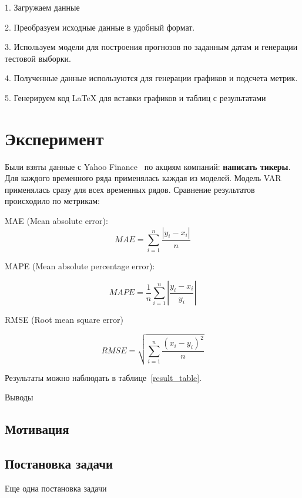 \documentclass[a4paper,article,14pt]{extarticle}
\begin{document}
1.
Загружаем данные

2.
Преобразуем исходные данные в удобный формат.

3.
Используем модели для построения прогнозов по заданным датам и генерации тестовой выборки.

4.
Полученные данные используются для генерации графиков и подсчета метрик.

5.
Генерируем код LaTeX для вставки графиков и таблиц с результатами

\section{Эксперимент}

Были взяты данные с Yahoo Finance~\cite{yahoo} по акциям компаний: \textbf{написать тикеры}.
Для каждого временного ряда применялась каждая из моделей.
Модель VAR применялась сразу для всех временных рядов.
Сравнение результатов происходило по метрикам:

MAE (Mean absolute error):
\begin{equation}
    MAE = \sum_{i=1}^{n} \frac{|y_i - x_i|}{n}\label{eq:mae}
\end{equation}

MAPE (Mean absolute percentage error):

\begin{equation}
    MAPE = \frac{1}{n} \sum_{i=1}^{n} \left| \frac{y_i - x_i}{y_i} \right|\label{eq:mape}
\end{equation}

RMSE (Root mean square error)

\begin{equation}
    RMSE = \sqrt{\sum_{i=1}^{n} \frac{(x_i - y_i) ^ 2}{n}}\label{eq:rmse}
\end{equation}

Результаты можно наблюдать в таблице~\ref{result_table}.


Выводы

\subsection{Мотивация}

\subsection{Постановка задачи}

Еще одна постановка задачи
\end{document}

